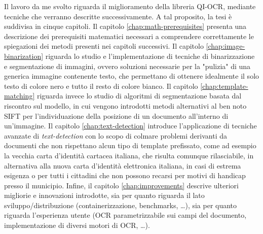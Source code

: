 Il lavoro da me svolto riguarda il miglioramento della libreria QI-OCR, mediante tecniche che verranno descritte successivamente. A tal proposito, la tesi \`e suddivisa in cinque capitoli. Il capitolo \ref{chap:math-prerequisites} presenta una descrizione dei prerequisiti matematici necessari a comprendere correttamente le spiegazioni dei metodi presenti nei capitoli successivi. Il capitolo \ref{chap:image-binarization} riguarda lo studio e l'implementazione di tecniche di binarizzazione e segmentazione di immagini, ovvero soluzioni necessarie per la "pulizia" di una generica immagine contenente testo, che permettano di ottenere idealmente il solo testo di colore nero e tutto il resto di colore bianco. Il capitolo \ref{chap:template-matching} riguarda invece lo studio di algoritmi di segmentazione basata dal riscontro sul modello, in cui vengono introdotti metodi alternativi al ben noto SIFT per l'individuazione della posizione di un documento all'interno di un'immagine. Il capitolo \ref{chap:text-detection} introduce l'applicazione di tecniche avanzate di \textit{text-detection} con lo scopo di colmare problemi derivanti da documenti che non rispettano alcun tipo di template prefissato, come ad esempio la vecchia carta d'identit\`a cartacea italiana, che risulta comunque rilasciabile, in alternativa alla nuova carta d'identit\`a elettronica italiana, in casi di estrema esigenza o per tutti i cittadini che non possono recarsi per motivi di handicap presso il municipio. Infine, il capitolo \ref{chap:improvements} descrive ulteriori migliorie e innovazioni introdotte, sia per quanto riguarda il lato sviluppo/distribuzione (containerizzazione, benchmarks, \dots), sia per quanto riguarda l'esperienza utente (OCR parametrizzabile sui campi del documento, implementazione di diversi motori di OCR, \dots).
